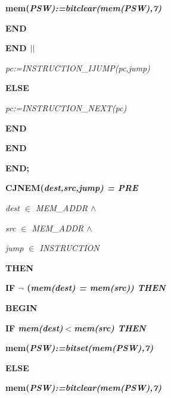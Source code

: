 \begin{sloppypar}
\hspace*{0.60in}\bf mem\rm (\it PSW\rm )\rm :=\it bitclear\rm (\it mem\rm (\it PSW\rm )\rm ,\rm 7\rm )

\hspace*{0.50in}\bf END

\hspace*{0.40in}\bf END  $\mbox{$\mid\mid$}$ 

\hspace*{0.40in}\it pc\rm :=\it INSTRUCTION\_IJUMP\rm (\it pc\rm ,\it jump\rm )

\hspace*{0.30in}\bf ELSE

\hspace*{0.40in}\it pc\rm :=\it INSTRUCTION\_NEXT\rm (\it pc\rm )

\hspace*{0.30in}\bf END

\hspace*{0.20in}\bf END

\hspace*{0.10in}\bf END\rm ;

\hspace*{0.10in}\bf CJNEM\rm (\it dest\rm ,\it src\rm ,\it jump\rm ) \rm = \bf PRE

\hspace*{0.20in}\it dest $\in$  \it MEM\_ADDR  $\land$ 

\hspace*{0.20in}\it src $\in$  \it MEM\_ADDR  $\land$ 

\hspace*{0.20in}\it jump $\in$  \it INSTRUCTION

\hspace*{0.10in}\bf THEN

\hspace*{0.20in}\bf IF  $\neg$ \rm (\it mem\rm (\it dest\rm ) \rm = \it mem\rm (\it src\rm )\rm ) \bf THEN

\hspace*{0.30in}\bf BEGIN

\hspace*{0.40in}\bf IF \it mem\rm (\it dest\rm )$<$\it mem\rm (\it src\rm ) \bf THEN

\hspace*{0.50in}\bf mem\rm (\it PSW\rm )\rm :=\it bitset\rm (\it mem\rm (\it PSW\rm )\rm ,\rm 7\rm )

\hspace*{0.40in}\bf ELSE

\hspace*{0.50in}\bf mem\rm (\it PSW\rm )\rm :=\it bitclear\rm (\it mem\rm (\it PSW\rm )\rm ,\rm 7\rm )


\end{sloppypar}
